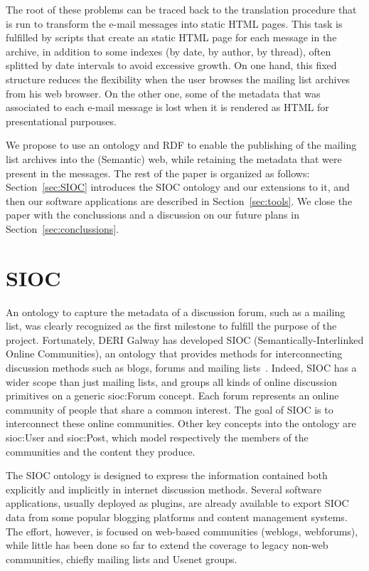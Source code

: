 \documentclass{llncs}
\begin{document}
The root of these problems can be traced back to the translation
procedure that is run to transform the e-mail messages into static
HTML pages. This task is fulfilled by scripts that create an
static HTML page for each message in the archive, in addition to
some indexes (by date, by author, by thread), often splitted by
date intervals to avoid excessive growth. On one hand, this fixed
structure reduces the flexibility when the user browses the
mailing list archives from his web browser. On the other one, some of
the metadata that was associated to each e-mail message is lost
when it is rendered as HTML for presentational purpouses.

We propose to use an ontology and RDF to enable the publishing of
the mailing list archives into the (Semantic) web, while retaining
the metadata that were present in the messages. The rest of the
paper is organized as follows: Section~\ref{sec:SIOC} introduces the
SIOC ontology and our extensions to it, and then our software
applications are described in Section~\ref{sec:tools}. We close
the paper with the conclussions and a discussion on our future plans
in Section~\ref{sec:conclussions}.

\section{\label{sec:SIOC}SIOC}

An ontology to capture the metadata of a discussion forum, such as
a mailing list, was clearly recognized as the first milestone to
fulfill the purpose of the project. Fortunately,
DERI Galway has developed
SIOC (Semantically-Interlinked Online Communities), an ontology
that provides methods for 
interconnecting discussion methods such as blogs, forums and mailing
lists~\cite{Breslin2005}. Indeed, SIOC has a wider scope than just
mailing lists, and groups all kinds of online discussion primitives
on a generic \textsf{sioc:Forum} concept. Each forum represents an online community
of people that share a common interest. The goal of SIOC is to interconnect
these online communities. Other key concepts into the ontology are
\textsf{sioc:User} and \textsf{sioc:Post}, which model respectively the
members of the
communities and the content they produce.

The SIOC ontology is designed to express the information contained
both explicitly 
and implicitly in internet discussion methods. Several software applications,
usually deployed as plugins,
are already available to export SIOC data from some popular blogging
platforms and content management systems. The effort, however, is
focused on web-based communities (weblogs, webforums), while little
has been done so far to extend the coverage to legacy non-web
communities, chiefly mailing lists and Usenet groups.
\end{document}
